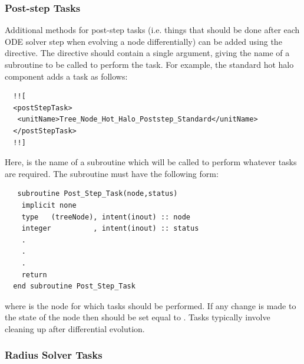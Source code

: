 \subsubsection{Post-step Tasks}

Additional methods for post-step tasks (i.e. things that should be done after each ODE solver step when evolving a node differentially) can be added using the  directive. The directive should contain a single argument, giving the name of a subroutine to be called to perform the task. For example, the standard hot halo component adds a task as follows:
\begin{verbatim}
  !![
  <postStepTask>
   <unitName>Tree_Node_Hot_Halo_Poststep_Standard</unitName>
  </postStepTask>
  !!]
\end{verbatim}
Here,  is the name of a subroutine which will be called to perform whatever tasks are required. The subroutine must have the following form:
\begin{verbatim}
   subroutine Post_Step_Task(node,status)
    implicit none
    type   (treeNode), intent(inout) :: node
    integer          , intent(inout) :: status
    .
    .
    .
    return
  end subroutine Post_Step_Task
\end{verbatim}
where  is the node for which tasks should be performed. If any change is made to the state of the node then  should be set equal to . Tasks typically involve cleaning up after differential evolution.

\subsubsection{Radius Solver Tasks}\label{sec:radius_solver}

